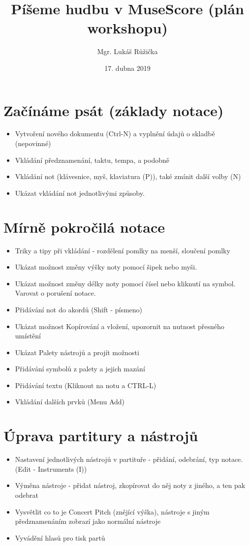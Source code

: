 \documentclass[12pt,a4paper]{article}
\title{ Píšeme hudbu v MuseScore (plán workshopu)}
\author{Mgr. Lukáš Růžička}
\date{17. dubna 2019}
\begin{document}
\maketitle

\section{Začínáme psát (základy notace)}
	\begin{itemize}
		\item  Vytvoření nového dokumentu (Ctrl-N) a vyplnění údajů o skladbě (nepovinné)
	 	\item Vkládání předznamenání, taktu, tempa, a podobně 
	 	\item Vkládání not (klávesnice, myš, klaviatura (P)), také zmínit další volby (N)
	 	\item Ukázat vkládání not jednotlivými způsoby.
	\end{itemize}

\section{Mírně pokročilá notace}
	\begin{itemize}
		\item Triky a tipy při vkládání - rozdělení pomlky na menší, sloučení pomlky
		\item Ukázat možnost změny výšky noty pomocí šipek nebo myši.
		\item Ukázat možnost změny délky noty pomocí čísel nebo kliknutí na symbol. Varovat o porušení notace.
		\item Přidávání not do akordů (Shift - písmeno)
		\item Ukázat možnost Kopírování a vložení, upozornit na nutnost přesného umístění
		\item Ukázat Palety nástrojů a projít možnosti
		\item Přidávání symbolů z palety a jejich mazání
		\item Přidávání textu (Kliknout na notu a CTRL-L)
		\item Vkládání dalších prvků (Menu Add)
	\end{itemize}
	
\section{Úprava partitury a nástrojů}
	
\begin{itemize}
		\item  Nastavení jednotlivých nástrojů v partituře - přidání, odebrání, typ notace. (Edit - Instruments (I))
		\item Výměna nástroje - přidat nástroj, zkopírovat do něj noty z jiného, a ten pak odebrat
		\item Vysvětlit co to je Concert Pitch (znějící výška), nástroje s jiným předznamenáním zobrazí jako normální nástroje
		\item Vyvádění hlasů pro tisk partů
\end{itemize}	
\end{document}
